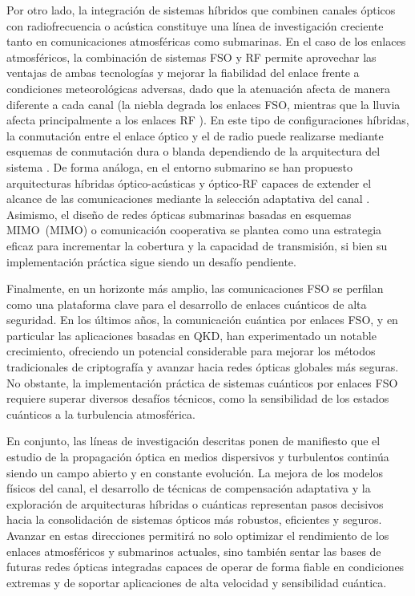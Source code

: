 Por otro lado, la integración de sistemas híbridos que combinen canales ópticos con radiofrecuencia o acústica constituye una línea de investigación creciente tanto en comunicaciones atmosféricas como submarinas. En el caso de los enlaces atmosféricos, la combinación de sistemas FSO y RF permite aprovechar las ventajas de ambas tecnologías y mejorar la fiabilidad del enlace frente a condiciones meteorológicas adversas, dado que la atenuación afecta de manera diferente a cada canal (la niebla degrada los enlaces FSO, mientras que la lluvia afecta principalmente a los enlaces RF \cite{Nadeem2009}). En este tipo de configuraciones híbridas, la conmutación entre el enlace óptico y el de radio puede realizarse mediante esquemas de conmutación dura o blanda dependiendo de la arquitectura del sistema \cite{Zhang2009}. De forma análoga, en el entorno submarino se han propuesto arquitecturas híbridas óptico-acústicas y óptico-RF capaces de extender el alcance de las comunicaciones mediante la selección adaptativa del canal \cite{Zeng}. Asimismo, el diseño de redes ópticas submarinas basadas en esquemas \acs{MIMO}~(\acl{MIMO}) \cite{Zhang2016,Zhang2015,Akhoundi2016,Jamali2016} o comunicación cooperativa \cite{Ahmad2012} se plantea como una estrategia eficaz para incrementar la cobertura y la capacidad de transmisión, si bien su implementación práctica sigue siendo un desafío pendiente.


Finalmente, en un horizonte más amplio, las comunicaciones FSO se perfilan como una plataforma clave para el desarrollo de enlaces cuánticos de alta seguridad. En los últimos años, la comunicación cuántica por enlaces FSO, y en particular las aplicaciones basadas en QKD, han experimentado un notable crecimiento, ofreciendo un potencial considerable para mejorar los métodos tradicionales de criptografía y avanzar hacia redes ópticas globales más seguras. No obstante, la implementación práctica de sistemas cuánticos por enlaces FSO requiere superar diversos desafíos técnicos, como la sensibilidad de los estados cuánticos a la turbulencia atmosférica.

En conjunto, las líneas de investigación descritas ponen de manifiesto que el estudio de la propagación óptica en medios dispersivos y turbulentos continúa siendo un campo abierto y en constante evolución. La mejora de los modelos físicos del canal, el desarrollo de técnicas de compensación adaptativa y la exploración de arquitecturas híbridas o cuánticas representan pasos decisivos hacia la consolidación de sistemas ópticos más robustos, eficientes y seguros. Avanzar en estas direcciones permitirá no solo optimizar el rendimiento de los enlaces atmosféricos y submarinos actuales, sino también sentar las bases de futuras redes ópticas integradas capaces de operar de forma fiable en condiciones extremas y de soportar aplicaciones de alta velocidad y sensibilidad cuántica.

\chapterend
